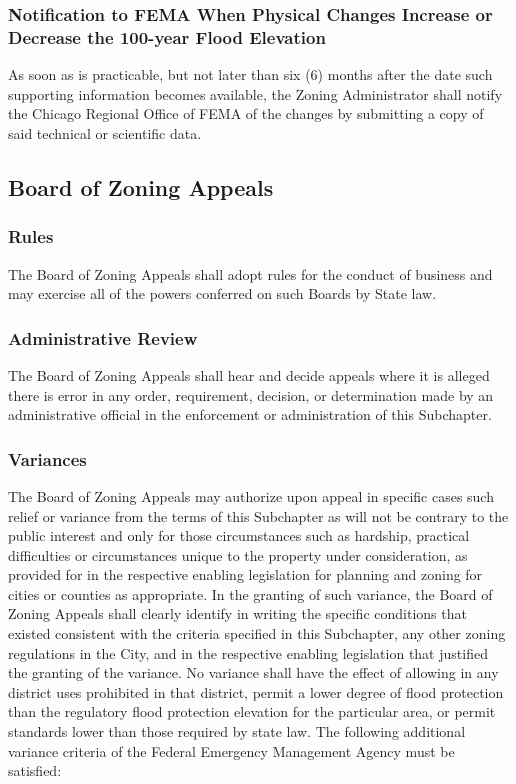 \subsubsection{Notification to FEMA When Physical Changes Increase or Decrease the 100-year Flood Elevation}
As soon as is practicable, but not later than six (6) months after the date such supporting information becomes available, the Zoning Administrator shall notify the Chicago Regional Office of FEMA of the changes by submitting a copy of said technical or scientific data.
\subsection{Board of Zoning Appeals}
\subsubsection{Rules}
The Board of Zoning Appeals shall adopt rules for the conduct of business and may exercise all of the powers conferred on such Boards by State law.
\subsubsection{Administrative Review}
The Board of Zoning Appeals shall hear and decide appeals where it is alleged there is error in any order, requirement, decision, or determination made by an administrative official in the enforcement or administration of this Subchapter.
\subsubsection{Variances}
The Board of Zoning Appeals may authorize upon appeal in specific cases such relief or variance from the terms of this Subchapter as will not be contrary to the public interest and only for those circumstances such as hardship, practical difficulties or circumstances unique to the property under consideration, as provided for in the respective enabling legislation for planning and zoning for cities or counties as appropriate. In the granting of such variance, the Board of Zoning Appeals shall clearly identify in writing the specific conditions that existed consistent with the criteria specified in this Subchapter, any other zoning regulations in the City, and in the respective enabling legislation that justified the granting of the variance. No variance shall have the effect of allowing in any district uses prohibited in that district, permit a lower degree of flood protection than the regulatory flood protection elevation for the particular area, or permit standards lower than those required by state law. The following additional variance criteria of the Federal Emergency Management Agency must be satisfied:
